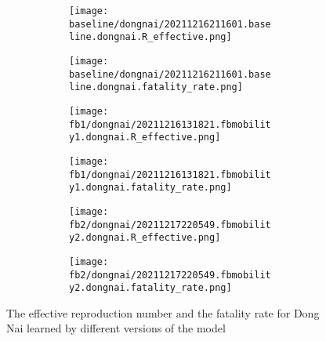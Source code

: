 \begin{figure}[!htb]
    \centering

    \begin{subfigure}[b]{\linewidth}
        \centering
        \begin{subfigure}[b]{0.4\linewidth}
            \texttt{[image: baseline/dongnai/20211216211601.baseline.dongnai.R\_effective.png]}
        \end{subfigure}
        \begin{subfigure}[b]{0.4\linewidth}
            \texttt{[image: baseline/dongnai/20211216211601.baseline.dongnai.fatality\_rate.png]}
        \end{subfigure}
    \end{subfigure}

    \begin{subfigure}[b]{\linewidth}
        \centering
        \begin{subfigure}[b]{0.4\linewidth}
            \texttt{[image: fb1/dongnai/20211216131821.fbmobility1.dongnai.R\_effective.png]}
        \end{subfigure}
        \begin{subfigure}[b]{0.4\linewidth}
            \texttt{[image: fb1/dongnai/20211216131821.fbmobility1.dongnai.fatality\_rate.png]}
        \end{subfigure}
    \end{subfigure}

    \begin{subfigure}[b]{\linewidth}
        \centering
        \begin{subfigure}[b]{0.4\linewidth}
            \texttt{[image: fb2/dongnai/20211217220549.fbmobility2.dongnai.R\_effective.png]}
        \end{subfigure}
        \begin{subfigure}[b]{0.4\linewidth}
            \texttt{[image: fb2/dongnai/20211217220549.fbmobility2.dongnai.fatality\_rate.png]}
        \end{subfigure}
    \end{subfigure}

    \caption{The effective reproduction number and the fatality rate for Dong Nai learned by different versions of the model}
    \label{fig:R0-and-fatality-dongnai}
\end{figure}


